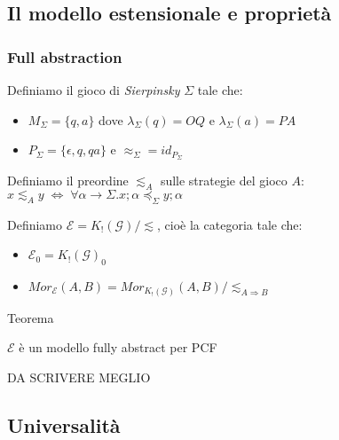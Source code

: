 \documentclass{beamer}
\begin{document}
\subsection{Il modello estensionale e proprietà}

\begin{frame}
	
	\frametitle{Full abstraction}
	
	Definiamo il gioco di \emph{Sierpinsky} $\Sigma$ tale che:
	\begin{itemize}
		\item $M_\Sigma = \{ q,a \}$ dove $\lambda_\Sigma (q)=OQ$ e $\lambda_\Sigma (a)=PA$
		\item $P_\Sigma = \{ \epsilon , q , qa \}$ e $\approx_\Sigma = id_{P_\Sigma}$
	\end{itemize}
	
	Definiamo il preordine $\lesssim_A$ sulle strategie del gioco $A$: $x \lesssim_A y \; \Leftrightarrow \; \forall \alpha \rightarrow \Sigma . x;\alpha \preccurlyeq_\Sigma y;\alpha$
	
	Definiamo $\mathcal{E} = K_!(\mathcal{G}) / \lesssim$, cioè la categoria tale che:
	\begin{itemize}
		\item $\mathcal{E}_0 = K_!(\mathcal{G})_0$
		\item $Mor_{\mathcal{E}}(A,B) = Mor_{K_!(\mathcal{G})}(A,B) / \lesssim_{A\Rightarrow B}$
	\end{itemize}

	
	\begin{block}{Teorema}
		
		$\mathcal{E}$ è un modello fully abstract per PCF
		
	\end{block}
	
	DA SCRIVERE MEGLIO
	
\end{frame}





\subsection{Universalità}
\end{document}
